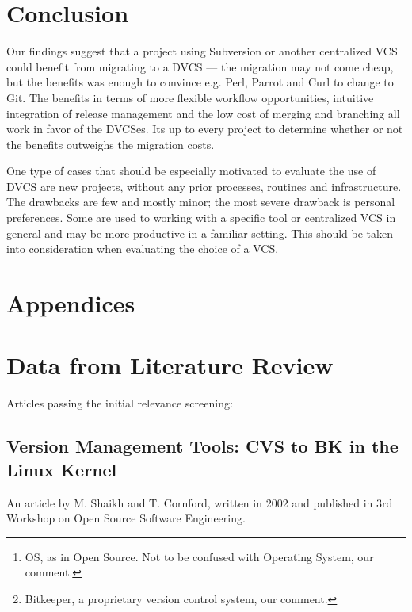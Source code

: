 \documentclass{llncs}
\begin{document}
\section{Conclusion}

Our findings suggest that a project using Subversion or another
centralized VCS could benefit from migrating to a DVCS --- the
migration may not come cheap, but the benefits was enough to convince
e.g. Perl, Parrot and Curl to change to Git. The benefits in terms of
more flexible workflow opportunities, intuitive integration of release
management and the low cost of merging and branching all work in favor
of the DVCSes. Its up to every project to determine whether or not the
benefits outweighs the migration costs.

One type of cases that should be especially motivated to evaluate the
use of DVCS are new projects, without any prior processes, routines
and infrastructure. The drawbacks are few and mostly minor; the most
severe drawback is personal preferences. Some are used to working with
a specific tool or centralized VCS in general and may be more
productive in a familiar setting. This should be taken into
consideration when evaluating the choice of a VCS.

 


\newpage
\section*{Appendices}
\appendix
\section{Data from Literature Review}

Articles passing the initial relevance screening:

\subsection{Version Management Tools: CVS to BK in the Linux Kernel}

An article by M. Shaikh and T. Cornford, written in 2002 and published 
in 3rd Workshop on Open Source Software Engineering.

\begin{abstract}
 Version management tools might be seen as a prerequisite for open
 source development today as projects become too large to be managed by
 maintainers alone. Yet the OS\footnote{ 
  OS, as in Open Source. Not to be confused with Operating System, our 
  comment.
 } process depends on fluid coordination and collaboration with the
 underlying qualities of this process based on firm trust and
 respect for fellow developers. This paper is a study of how
 debate over version tools reflects governance and decision making
 in an OS community. The paper is based on a study of the Linux kernel
 community as it first saw a partial acceptance of the CVS tool, and then
 later adopted BK\footnote{
  Bitkeeper, a proprietary version control system, our comment. 
 }. The paper explains the adoption process in relation to governance
 concerns, license issues, and questions of technical performance.
\end{abstract}
\end{document}
